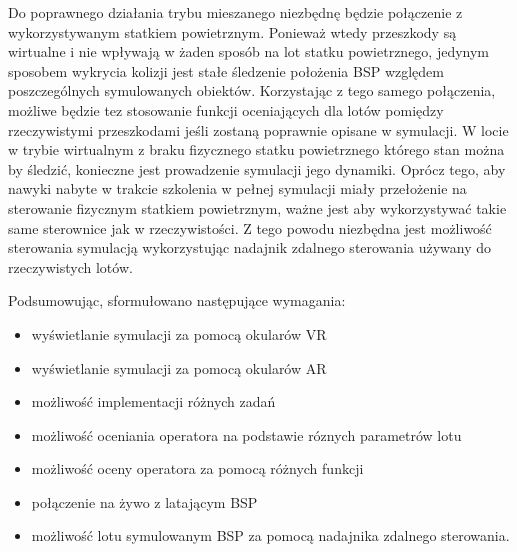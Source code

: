 Do poprawnego działania trybu mieszanego niezbędnę będzie połączenie z wykorzystywanym statkiem powietrznym. Ponieważ wtedy przeszkody są wirtualne i nie wpływają w żaden sposób na lot statku powietrznego, jedynym sposobem wykrycia kolizji jest stałe śledzenie położenia BSP względem poszczególnych symulowanych obiektów. Korzystając z tego samego połączenia, możliwe będzie tez stosowanie funkcji oceniających dla lotów pomiędzy rzeczywistymi przeszkodami jeśli zostaną poprawnie opisane w symulacji. W locie w trybie wirtualnym z braku fizycznego statku powietrznego którego stan można by śledzić, konieczne jest prowadzenie symulacji jego dynamiki. Oprócz tego, aby nawyki nabyte w trakcie szkolenia w pełnej symulacji miały przełożenie na sterowanie fizycznym statkiem powietrznym, ważne jest aby wykorzystywać takie same sterownice jak w rzeczywistości. Z tego powodu niezbędna jest możliwość sterowania symulacją wykorzystując nadajnik zdalnego sterowania używany do rzeczywistych lotów.

Podsumowując, sformułowano następujące wymagania:
\begin{itemize}
  \item wyświetlanie symulacji za pomocą okularów VR
  \item wyświetlanie symulacji za pomocą okularów AR
  \item możliwość implementacji różnych zadań
  \item możliwość oceniania operatora na podstawie róznych parametrów lotu
  \item możliwość oceny operatora za pomocą różnych funkcji
  \item połączenie na żywo z latającym BSP
  \item możliwość lotu symulowanym BSP za pomocą nadajnika zdalnego sterowania.
\end{itemize}
